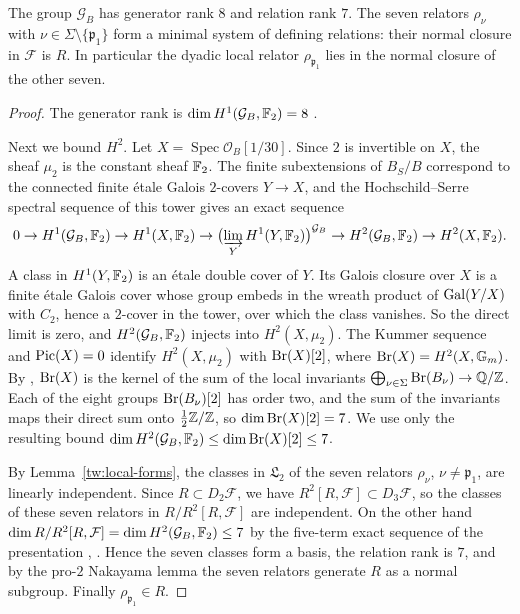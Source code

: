 \begin{lemma}\label{tw:complete-global-presentation}
The group $\mathcal G_B$ has generator rank $8$ and relation rank $7$. The
seven relators $\rho_\nu$ with $\nu\in\Sigma\setminus\{\mathfrak p_1\}$ form
a minimal system of defining relations: their normal closure in
$\mathcal F$ is $R$. In particular the dyadic local relator
$\rho_{\mathfrak p_1}$ lies in the normal closure of the other seven.
\end{lemma}

\begin{proof}
The generator rank is $\dim H^1(\mathcal G_B,\mathbb F_2)=8$
\cite[Proposition~3.9.1]{NeukirchSchmidtWingberg2008}.

Next we bound $H^2$. Let $X=\operatorname{Spec}\mathcal O_B[1/30]$. Since
$2$ is invertible on $X$, the sheaf $\mu_2$ is the constant sheaf $\mathbb F_2$.
The finite subextensions of $B_S/B$ correspond to the connected finite étale
Galois $2$-covers $Y\to X$, and the Hochschild--Serre spectral sequence of
this tower \cite[Theorem~14.9 and Remark~14.10]{MilneEtale} gives an exact
sequence
\[
 0\to H^1(\mathcal G_B,\mathbb F_2)\to H^1(X,\mathbb F_2)\to
 \bigl(\varinjlim_Y H^1(Y,\mathbb F_2)\bigr)^{\mathcal G_B}\to
 H^2(\mathcal G_B,\mathbb F_2)\to H^2(X,\mathbb F_2).
\]
A class in $H^1(Y,\mathbb F_2)$ is an étale double cover of $Y$. Its Galois closure
over $X$ is a finite étale Galois cover whose group embeds in the wreath
product of $\operatorname{Gal}(Y/X)$ with $C_2$, hence a $2$-cover in the tower, over which
the class vanishes. So the direct limit is zero, and
$H^2(\mathcal G_B,\mathbb F_2)$ injects into $H^2(X,\mu_2)$. The Kummer sequence and
$\operatorname{Pic}(X)=0$ identify $H^2(X,\mu_2)$ with $\operatorname{Br}(X)[2]$, where
$\operatorname{Br}(X)=H^2(X,\mathbb G_m)$. By \cite[Theorem~6.8.3 and
Example~6.9.4]{Poonen}, $\operatorname{Br}(X)$ is the kernel of the sum of the local
invariants $\bigoplus_{\nu\in\Sigma}\operatorname{Br}(B_\nu)\to\mathbb Q/\mathbb Z$. Each of the eight
groups $\operatorname{Br}(B_\nu)[2]$ has order two, and the sum of the invariants maps their
direct sum onto $\frac12\mathbb Z/\mathbb Z$, so $\dim\operatorname{Br}(X)[2]=7$. We use only the
resulting bound $\dim H^2(\mathcal G_B,\mathbb F_2)\le\dim\operatorname{Br}(X)[2]\le7$.

By Lemma~\ref{tw:local-forms}, the classes in $\mathfrak L_2$ of the seven
relators $\rho_\nu$, $\nu\ne\mathfrak p_1$, are linearly independent. Since
$R\subset D_2\mathcal F$, we have $R^2[R,\mathcal F]\subset D_3\mathcal F$, so
the classes of these seven relators in $R/R^2[R,\mathcal F]$ are independent.
On the other hand
$\dim R/R^2[R,\mathcal F]=\dim H^2(\mathcal G_B,\mathbb F_2)\le7$ by the five-term
exact sequence of the presentation
\cite[Proposition~3.9.5]{NeukirchSchmidtWingberg2008},
\cite[(3.3)--(3.4)]{Quadrelli2021}. Hence the seven classes form a basis, the
relation rank is $7$, and by the pro-$2$ Nakayama lemma
\cite[Corollary~3.9.3]{NeukirchSchmidtWingberg2008} the seven relators
generate $R$ as a normal subgroup. Finally $\rho_{\mathfrak p_1}\in R$.
\end{proof}

